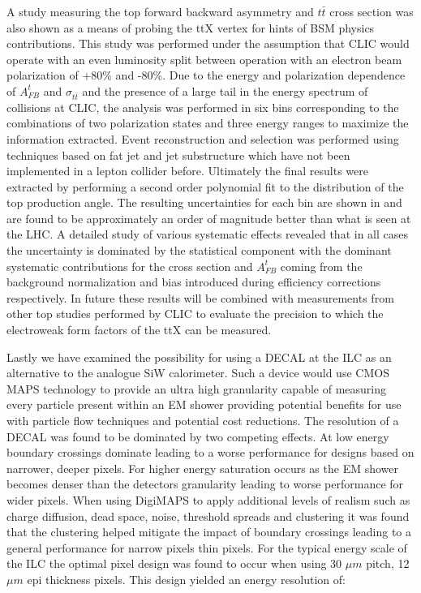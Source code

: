 A study measuring the top forward backward asymmetry and $t\bar{t}$ cross section was also shown as a means of probing the ttX vertex for hints of \ac{BSM} physics contributions. This study was performed under the assumption that \ac{CLIC} would operate with an even luminosity split between operation with an electron beam polarization of +80\% and -80\%. Due to the energy and polarization dependence of $A_{FB}^t$ and $\sigma_{t\bar{t}}$ and the presence of a large tail in the energy spectrum of collisions at \ac{CLIC}, the analysis was performed in six bins corresponding to the combinations of two polarization states and three energy ranges to maximize the information extracted. Event reconstruction and selection was performed using techniques based on fat jet and jet substructure which have not been implemented in a lepton collider before. Ultimately the final results were extracted by performing a second order polynomial fit to the distribution of the top production angle. The resulting uncertainties for each bin are shown in  and are found to be approximately an order of magnitude better than what is seen at the \ac{LHC}\cite{Bai:2011uk}. A detailed study of various systematic effects revealed that in all cases the uncertainty is dominated by the statistical component with the dominant systematic contributions for the cross section and $A_{FB}^t$ coming from the background normalization and bias introduced during efficiency corrections respectively. In future these results will be combined with measurements from other top studies performed by \ac{CLIC} to evaluate the precision to which the electroweak form factors of the ttX can be measured.

Lastly we have examined the possibility for using a \ac{DECAL} at the \ac{ILC} as an alternative to the analogue SiW calorimeter. Such a device would use \ac{CMOS} \ac{MAPS} technology to provide an ultra high granularity capable of measuring every particle present within an \ac{EM} shower providing potential benefits for use with particle flow techniques and potential cost reductions. The resolution of a \ac{DECAL} was found to be dominated by two competing effects. At low energy boundary crossings dominate leading to a worse performance for designs based on narrower, deeper pixels. For higher energy saturation occurs as the EM shower becomes denser than the detectors granularity leading to worse performance for wider pixels. When using DigiMAPS to apply additional levels of realism such as charge diffusion, dead space, noise, threshold spreads and clustering it was found that the clustering helped mitigate the impact of boundary crossings leading to a general performance for narrow pixels thin pixels. For the typical energy scale of the \ac{ILC} the optimal pixel design was found to occur when using 30 $\mu m$ pitch, 12 $\mu m$ epi thickness pixels. This design yielded an energy resolution of:

